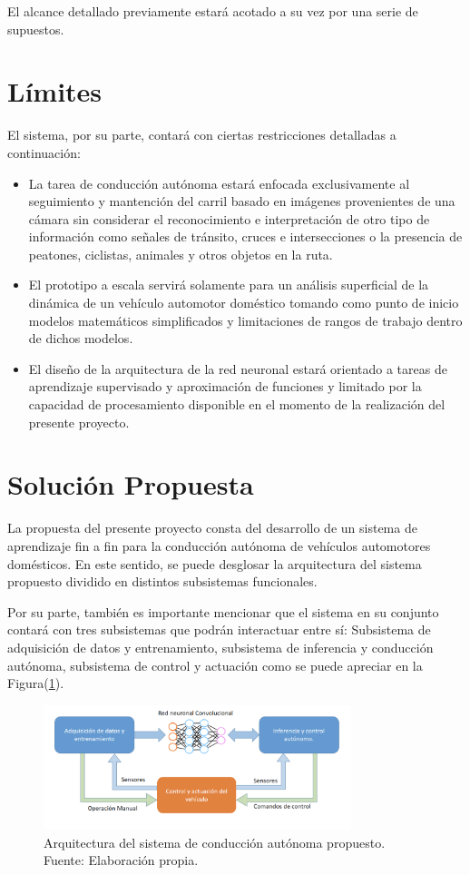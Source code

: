 \documentclass[12pt,letterpaper]{article}
\begin{document}
El alcance detallado previamente estará acotado a su vez por una serie de supuestos.

\section{Límites}
El sistema, por su parte, contará con ciertas restricciones detalladas a 
continuación:
\begin{itemize}
    \item La tarea de conducción autónoma estará enfocada exclusivamente al 
    seguimiento y mantención del carril basado en imágenes provenientes de una cámara 
    sin considerar el reconocimiento e interpretación de otro tipo de información como 
    señales de tránsito, cruces e intersecciones o la presencia de peatones, ciclistas, 
    animales y otros objetos en la ruta.
    \item El prototipo a escala servirá solamente para un análisis superficial 
    de la dinámica de un vehículo automotor doméstico tomando como punto 
    de inicio modelos matemáticos simplificados y limitaciones de rangos de trabajo dentro 
    de dichos modelos.
    \item El diseño de la arquitectura de la red neuronal estará orientado a 
    tareas de aprendizaje supervisado y aproximación de funciones y limitado por la capacidad de 
    procesamiento disponible en el momento de la realización del presente proyecto.
\end{itemize}

\section{Solución Propuesta}

La propuesta del presente proyecto consta del desarrollo de un sistema de aprendizaje
fin a fin para la conducción autónoma de vehículos automotores domésticos. En este
sentido, se puede desglosar la arquitectura del sistema propuesto dividido en 
distintos subsistemas funcionales.

Por su parte, también es importante mencionar que el sistema en su conjunto contará 
con tres subsistemas que podrán interactuar entre sí: Subsistema de adquisición de datos y 
entrenamiento, subsistema de inferencia y conducción autónoma, subsistema de control 
y actuación como se puede apreciar en la Figura(\ref{fig:nuevo_esquema}).

\begin{figure}[!h] 
    \centering
    \includegraphics[width=0.80\textwidth]{img/nuevo_esquema}
    \caption{Arquitectura del sistema de conducción autónoma propuesto. Fuente: Elaboración propia.}
    \label{fig:nuevo_esquema}
\end{figure}
\end{document}
